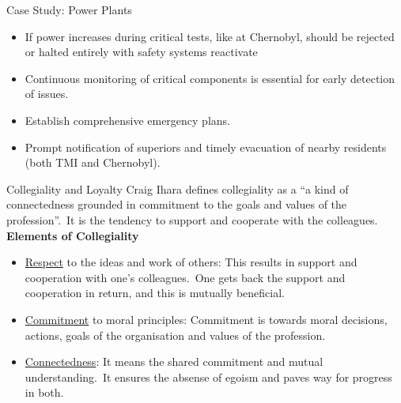 \documentclass[11pt]{beamer}
\begin{document}
\begin{frame}[t,allowframebreaks]{Case Study: Power Plants}
\begin{itemize}
            \item If power increases during critical tests, like at Chernobyl, should be rejected or halted entirely
            with safety systems reactivate
            \item Continuous monitoring of critical components is essential for early detection of issues.
            \item Establish comprehensive emergency plans.
            \item Prompt notification of superiors and timely evacuation of nearby residents (both TMI and Chernobyl).
        \end{itemize}
    \end{frame}

    \begin{frame}[t,allowframebreaks]{Collegiality and Loyalty}
        Craig Ihara defines collegiality as a ``a kind of connectedness grounded in commitment to the goals and
        values of the profession''.\ It is the tendency to support and cooperate with the colleagues.
        \\[5pt]
        \textbf{Elements of Collegiality}\\[5pt]
        \begin{itemize}
            \item \ul{Respect} to the ideas and work of others: This results in support and cooperation with one's
            colleagues.\ One gets back the support and cooperation in return, and this is mutually beneficial.
            \item \ul{Commitment} to moral principles: Commitment is towards moral decisions, actions, goals of
            the organisation and values of the profession.
            \item \ul{Connectedness}: It means the shared commitment and mutual understanding.\ It ensures the
            absense of egoism and paves way for progress in both.
        \end{itemize}

        \framebreak


\end{frame}
\end{document}
